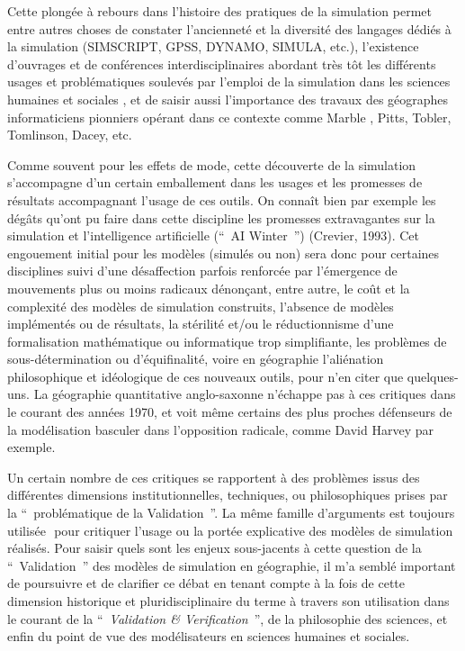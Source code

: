 Cette plongée à rebours dans l'histoire des pratiques de la simulation permet entre autres choses de constater l'ancienneté et la diversité des langages dédiés à la simulation (SIMSCRIPT, GPSS, DYNAMO, SIMULA, etc.), l'existence d'ouvrages et de conférences interdisciplinaires abordant très tôt les différents usages et problématiques soulevés par l'emploi de la simulation dans les sciences humaines et sociales \autocites{Shubik1960b,Shubik1960a, Borko1962, Guetzkow1962, Beshers1965, Guetzkow1972, Shubik1972, Morgan2004, Dutton1971}⁠⁠, et de saisir aussi l'importance des travaux des géographes informaticiens pionniers opérant dans ce contexte comme Marble , Pitts, Tobler, Tomlinson, Dacey, etc. \autocites{Marble2010, Marble1972}

Comme souvent pour les effets de mode, cette découverte de la simulation s'accompagne d'un certain emballement dans les usages et les promesses de résultats accompagnant l'usage de ces outils. On connaît bien par exemple les dégâts qu'ont pu faire dans cette discipline les promesses extravagantes sur la simulation et l'intelligence artificielle (\foreignquote{english}{ AI Winter }) (Crevier, 1993). %
Cet engouement initial pour les modèles (simulés ou non) sera donc pour certaines disciplines suivi d'une désaffection parfois renforcée par l'émergence de mouvements plus ou moins radicaux dénonçant, entre autre, le coût et la complexité des modèles de simulation construits, l'absence de modèles implémentés ou de résultats, la stérilité et/ou le réductionnisme d'une formalisation mathématique ou informatique trop simplifiante, les problèmes de sous-détermination ou d'équifinalité, voire en géographie l'aliénation philosophique et idéologique de ces nouveaux outils, pour n'en citer que quelques-uns. La géographie quantitative anglo-saxonne n'échappe pas à ces critiques dans le courant des années 1970, et voit même certains des plus proches défenseurs de la modélisation basculer dans l'opposition radicale, comme David Harvey par exemple.

Un certain nombre de ces critiques se rapportent à des problèmes issus des différentes dimensions institutionnelles, techniques, ou philosophiques prises par la \enquote{ problématique de la Validation }. La même famille d'arguments est toujours utilisée \autocites{Amblard2006, Waldherr2013}⁠ pour critiquer l'usage ou la portée explicative des modèles de simulation réalisés. Pour saisir quels sont les enjeux sous-jacents à cette question de la \enquote{ Validation } des modèles de simulation en géographie, il m'a semblé important de poursuivre et de clarifier ce débat en tenant compte à la fois de cette dimension historique et pluridisciplinaire du terme à travers son utilisation dans le courant de la \enquote{ \textit{Validation \& Verification} }, de la philosophie des sciences, et enfin du point de vue des modélisateurs en sciences humaines et sociales. 

